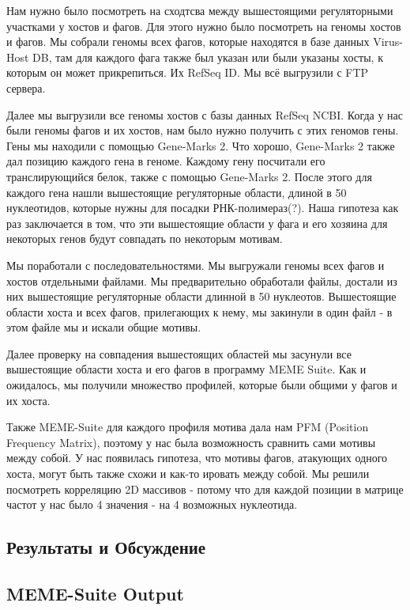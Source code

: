 \documentclass[14pt]{extarticle}
\begin{document}
\par{Нам нужно было посмотреть на сходтсва между вышестоящими регуляторными участками у хостов и фагов. Для этого нужно
было посмотреть на геномы хостов и фагов. Мы собрали геномы всех фагов, которые находятся в базе данных Virus-Host DB,
там для каждого фага также был указан или были указаны хосты, к которым он может прикрепиться. Их RefSeq ID. Мы всё
выгрузили с FTP сервера.}

\par{Далее мы выгрузили все геномы хостов с базы данных RefSeq NCBI. Когда у нас были геномы фагов и их хостов, нам было
нужно получить с этих геномов гены. Гены мы находили с помощью Gene-Marks 2. Что хорошо, Gene-Marks 2 также дал позицию
каждого гена в геноме. Каждому гену посчитали его транслирующийся белок, также с помощью Gene-Marks 2. После этого для
каждого гена нашли вышестоящие регуляторные области, длиной в 50 нуклеотидов, которые нужны для посадки 
РНК-полимераз(?).
Наша гипотеза как раз заключается в том, что эти вышестоящие области у фага и его хозяина для некоторых генов будут
совпадать по некоторым мотивам.}

\par{Мы поработали с последовательностями. Мы выгружали геномы всех фагов и хостов отдельными файлами. Мы предварительно
обработали файлы, достали из них вышестоящие регуляторные области длинной в 50 нуклеотов. Вышестоящие области хоста и
всех фагов, прилегающих к нему, мы закинули в один файл - в этом файле мы и искали общие мотивы.}

\par{Далее проверку на совпадения вышестоящих областей мы засунули все вышестоящие области хоста и его фагов в программу
MEME Suite. Как и ожидалось, мы получили множество профилей, которые были общими у фагов и их хоста. }

\par{Также MEME-Suite для каждого профиля мотива дала нам PFM (Position Frequency Matrix), поэтому у нас была 
возможность
сравнить сами мотивы между собой. У нас появилась гипотеза, что мотивы фагов, атакующих одного хоста, могут быть также
схожи и как-то ировать между собой. Мы решили посмотреть корреляцию 2D массивов - потому что для каждой позиции в
матрице частот у нас было 4 значения - на 4 возможных нуклеотида.}

\newpage
\begin{center}
    \item \section{Результаты и Обсуждение}
    \item \subsection{MEME-Suite Output}
\end{center}
\end{document}
